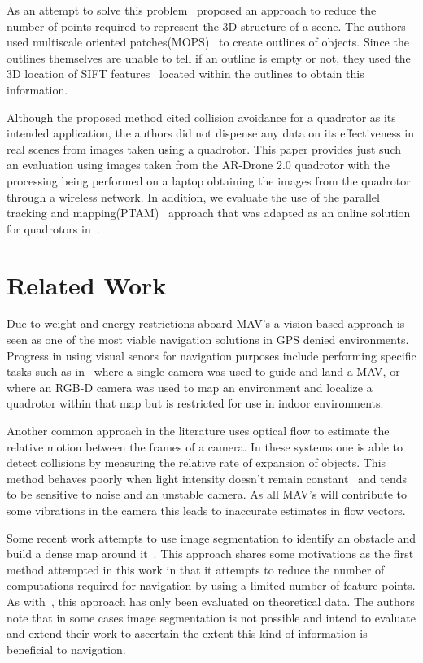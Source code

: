 \documentclass{acmsiggraph}
\begin{document}
As an attempt to solve this problem~\cite{lee2011} proposed an approach to reduce the number of points required to 
represent the 3D structure of a scene.  The authors used multiscale oriented patches(MOPS)~\cite{BSW05} to create outlines of 
objects.  Since the outlines themselves are unable to tell if an outline is empty or not, they used the 3D location of SIFT 
features~\cite{lowe2004} located within the outlines to obtain this information.  

Although the proposed method cited collision avoidance for a quadrotor as its intended application, the authors did not 
dispense any data on its effectiveness in real scenes from images taken using a quadrotor.  This paper provides just such an 
evaluation using images taken from the AR-Drone 2.0 quadrotor with the processing being performed on a laptop obtaining the 
images from the quadrotor through a wireless network. In addition, we evaluate the use of the parallel tracking and 
mapping(PTAM)~\cite{klein07parallel} approach that was adapted as an online solution for quadrotors in~\cite{weiss2011}.

\section{Related Work}
Due to weight and energy restrictions aboard MAV's a vision based approach is seen as one of the most viable navigation 
solutions in GPS denied environments.  Progress in using visual senors for navigation purposes include performing specific 
tasks such as in~\cite{johnson2005} where a single camera was used to guide and land a MAV, or~\cite{huang2011isrr} where an 
RGB-D camera was used to map an environment and localize a quadrotor within that map but is restricted for use in indoor
environments.

Another common approach in the literature uses optical flow to estimate the relative motion between the frames of a camera.
In these systems one is able to detect collisions by measuring the relative rate of expansion of objects.  This method 
behaves poorly when light intensity doesn't remain constant~\cite{horn1981} and tends to be sensitive to noise and
an unstable camera.  As all MAV's will contribute to some vibrations in the camera this leads to inaccurate estimates in
flow vectors.

Some recent work attempts to use image segmentation to identify an obstacle and build a dense map around it~\cite{ha2012}.  
This approach shares some motivations as the first method attempted in this work in that it attempts to reduce the number
of computations required for navigation by using a limited number of feature points.  As with~\cite{lee2011}, this approach
has only been evaluated on theoretical data.  The authors note that in some cases image segmentation is not possible and 
intend to evaluate and extend their work to ascertain the extent this kind of information is beneficial to navigation.
\end{document}
